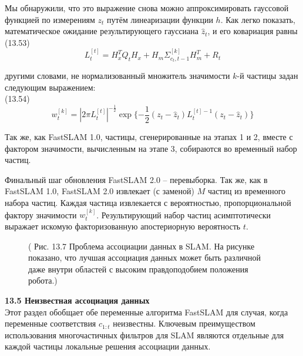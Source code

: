 \documentclass[10pt,a4paper]{article}
\begin{document}
Мы обнаружили, что это выражение снова можно аппроксимировать гауссовой функцией по измерениям $z_t$ путём линеаризации функции $h$. Как легко показать, математическое ожидание результирующего гауссиана $\hat{z}_t$, и его ковариация равны\\

(13.53)
$$L_t^{[t]}=H_x^TQ_tH_x+H_m\varSigma_{c_t,t-1}^{[k]}H_m^T+R_t$$

другими словами, не нормализованный множитель значимости $k$-й частицы задан следующим выражением:\\

(13.54)
$$w_t^{[k]}=|2\pi L_t^{[t]}|^{-\frac{1}{2}}\exp\{-\frac{1}{2}(z_t-\hat{z}_t)L_t^{[t]-1}(z_t-\hat{z}_t)\}$$

Так же, как FastSLAM 1.0, частицы, сгенерированные на этапах 1 и 2, вместе с фактором значимости, вычисленным на этапе 3, собираются во временный набор частиц.

Финальный шаг обновления FastSLAM 2.0 – перевыборка.  Так же, как в FastSLAM 1.0, FastSLAM 2.0 извлекает (с заменой) $M$ частиц  из временного набора частиц. Каждая частица извлекается с вероятностью, пропорциональной фактору значимости $w_t^{[k]}$. Результирующий набор частиц асимптотически выражает искомую факторизованную апостериорную вероятность $t$.

\begin{figure}[H]
	\caption{ ( Рис. 13.7 Проблема ассоциации данных в SLAM. На рисунке показано, что лучшая ассоциация данных может быть различной даже внутри областей с высоким правдоподобием положения робота.) }
	\label{fig:137orig}
\end{figure}

\textbf{13.5	Неизвестная ассоциация данных}\\

Этот раздел обобщает обе переменные алгоритма FastSLAM для случая, когда переменные соответствия $c_{1:t}$ неизвестны. Ключевым преимуществом использования многочастичных фильтров для SLAM являются отдельные для каждой частицы локальные решения ассоциации данных.
\end{document}
